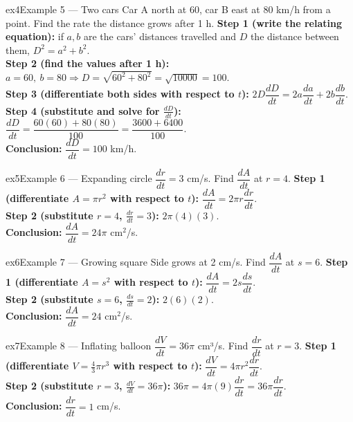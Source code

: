 \documentclass[11pt]{article}
\begin{document}
\begin{example}{ex4}{Example 5 --- Two cars}
Car A north at 60, car B east at 80 km/h from a point. Find the rate the distance grows after 1 h.\soln
\textbf{Step 1 (write the relating equation):} if $a,b$ are the cars' distances travelled and $D$ the distance between them, $D^2=a^2+b^2$.\\[3pt]
\textbf{Step 2 (find the values after 1 h):} $a=60,\ b=80\Rightarrow D=\sqrt{60^2+80^2}=\sqrt{10000}=100$.\\[3pt]
\textbf{Step 3 (differentiate both sides with respect to $t$):} $2D\dfrac{dD}{dt}=2a\dfrac{da}{dt}+2b\dfrac{db}{dt}$.\\[3pt]
\textbf{Step 4 (substitute and solve for $\frac{dD}{dt}$):} $\dfrac{dD}{dt}=\dfrac{60(60)+80(80)}{100}=\dfrac{3600+6400}{100}$.\\[3pt]
\textbf{Conclusion:} $\dfrac{dD}{dt}=100$ km/h.
\end{example}

\begin{example}{ex5}{Example 6 --- Expanding circle}
$\dfrac{dr}{dt}=3$ cm/s. Find $\dfrac{dA}{dt}$ at $r=4$.\soln
\textbf{Step 1 (differentiate $A=\pi r^2$ with respect to $t$):} $\dfrac{dA}{dt}=2\pi r\dfrac{dr}{dt}$.\\[3pt]
\textbf{Step 2 (substitute $r=4$, $\frac{dr}{dt}=3$):} $2\pi(4)(3)$.\\[3pt]
\textbf{Conclusion:} $\dfrac{dA}{dt}=24\pi$ cm$^2$/s.
\end{example}

\begin{example}{ex6}{Example 7 --- Growing square}
Side grows at 2 cm/s. Find $\dfrac{dA}{dt}$ at $s=6$.\soln
\textbf{Step 1 (differentiate $A=s^2$ with respect to $t$):} $\dfrac{dA}{dt}=2s\dfrac{ds}{dt}$.\\[3pt]
\textbf{Step 2 (substitute $s=6$, $\frac{ds}{dt}=2$):} $2(6)(2)$.\\[3pt]
\textbf{Conclusion:} $\dfrac{dA}{dt}=24$ cm$^2$/s.
\end{example}

\begin{example}{ex7}{Example 8 --- Inflating balloon}
$\dfrac{dV}{dt}=36\pi$ cm³/s. Find $\dfrac{dr}{dt}$ at $r=3$.\soln
\textbf{Step 1 (differentiate $V=\tfrac43\pi r^3$ with respect to $t$):} $\dfrac{dV}{dt}=4\pi r^2\dfrac{dr}{dt}$.\\[3pt]
\textbf{Step 2 (substitute $r=3$, $\frac{dV}{dt}=36\pi$):} $36\pi=4\pi(9)\dfrac{dr}{dt}=36\pi\dfrac{dr}{dt}$.\\[3pt]
\textbf{Conclusion:} $\dfrac{dr}{dt}=1$ cm/s.
\end{example}
\end{document}
